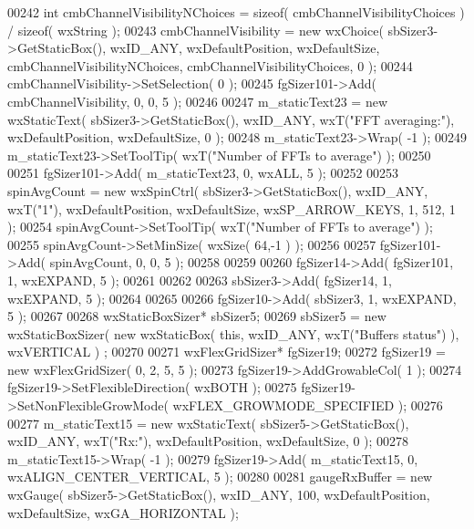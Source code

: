 \begin{DoxyCode}
00242     \textcolor{keywordtype}{int} cmbChannelVisibilityNChoices = \textcolor{keyword}{sizeof}( cmbChannelVisibilityChoices ) / \textcolor{keyword}{sizeof}( wxString );
00243     cmbChannelVisibility = \textcolor{keyword}{new} wxChoice( sbSizer3->GetStaticBox(), wxID\_ANY, wxDefaultPosition, 
      wxDefaultSize, cmbChannelVisibilityNChoices, cmbChannelVisibilityChoices, 0 );
00244     cmbChannelVisibility->SetSelection( 0 );
00245     fgSizer101->Add( cmbChannelVisibility, 0, 0, 5 );
00246     
00247     m_staticText23 = \textcolor{keyword}{new} wxStaticText( sbSizer3->GetStaticBox(), wxID\_ANY, wxT(\textcolor{stringliteral}{"FFT averaging:"}), 
      wxDefaultPosition, wxDefaultSize, 0 );
00248     m_staticText23->Wrap( -1 );
00249     m_staticText23->SetToolTip( wxT(\textcolor{stringliteral}{"Number of FFTs to average"}) );
00250     
00251     fgSizer101->Add( m_staticText23, 0, wxALL, 5 );
00252     
00253     spinAvgCount = \textcolor{keyword}{new} wxSpinCtrl( sbSizer3->GetStaticBox(), wxID\_ANY, wxT(\textcolor{stringliteral}{"1"}), wxDefaultPosition, 
      wxDefaultSize, wxSP\_ARROW\_KEYS, 1, 512, 1 );
00254     spinAvgCount->SetToolTip( wxT(\textcolor{stringliteral}{"Number of FFTs to average"}) );
00255     spinAvgCount->SetMinSize( wxSize( 64,-1 ) );
00256     
00257     fgSizer101->Add( spinAvgCount, 0, 0, 5 );
00258     
00259     
00260     fgSizer14->Add( fgSizer101, 1, wxEXPAND, 5 );
00261     
00262     
00263     sbSizer3->Add( fgSizer14, 1, wxEXPAND, 5 );
00264     
00265     
00266     fgSizer10->Add( sbSizer3, 1, wxEXPAND, 5 );
00267     
00268     wxStaticBoxSizer* sbSizer5;
00269     sbSizer5 = \textcolor{keyword}{new} wxStaticBoxSizer( \textcolor{keyword}{new} wxStaticBox( \textcolor{keyword}{this}, wxID\_ANY, wxT(\textcolor{stringliteral}{"Buffers status"}) ), wxVERTICAL )
      ;
00270     
00271     wxFlexGridSizer* fgSizer19;
00272     fgSizer19 = \textcolor{keyword}{new} wxFlexGridSizer( 0, 2, 5, 5 );
00273     fgSizer19->AddGrowableCol( 1 );
00274     fgSizer19->SetFlexibleDirection( wxBOTH );
00275     fgSizer19->SetNonFlexibleGrowMode( wxFLEX\_GROWMODE\_SPECIFIED );
00276     
00277     m_staticText15 = \textcolor{keyword}{new} wxStaticText( sbSizer5->GetStaticBox(), wxID\_ANY, wxT(\textcolor{stringliteral}{"Rx:"}), wxDefaultPosition, 
      wxDefaultSize, 0 );
00278     m_staticText15->Wrap( -1 );
00279     fgSizer19->Add( m_staticText15, 0, wxALIGN\_CENTER\_VERTICAL, 5 );
00280     
00281     gaugeRxBuffer = \textcolor{keyword}{new} wxGauge( sbSizer5->GetStaticBox(), wxID\_ANY, 100, wxDefaultPosition, wxDefaultSize,
       wxGA\_HORIZONTAL );

\end{DoxyCode}
